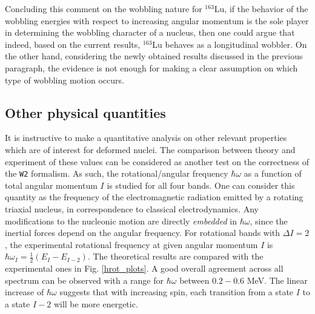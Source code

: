 \documentclass[myclassdoc,debug]{rjparticle}
\begin{document}
Concluding this comment on the wobbling nature for $^{163}$Lu, if the behavior of the wobbling energies with respect to increasing angular momentum is the sole player in determining the wobbling character of a nucleus, then one could argue that indeed, based on the current results, $^{163}$Lu behaves as a longitudinal wobbler. On the other hand, considering the newly obtained results discussed in the previous paragraph, the evidence is not enough for making a clear assumption on which type of wobbling motion occurs.

\subsection{Other physical quantities}\label{subsection:routhians}

It is instructive to make a quantitative analysis on other relevant properties which are of interest for deformed nuclei. The comparison between theory and experiment of these values can be considered as another test on the correctness of the \texttt{W2} formalism. As such, the rotational/angular frequency $\hbar\omega$ as a function of total angular momentum $I$ is studied for all four bands. One can consider this quantity as the frequency of the electromagnetic radiation emitted by a rotating triaxial nucleus, in correspondence to classical electrodynamics. Any modifications to the nucleonic motion are directly \emph{embedded} in $\hbar\omega$, since the inertial forces depend on the angular frequency. For rotational bands with $\Delta I=2$, the experimental rotational frequency at given angular momentum $I$ is $\hbar\omega_I=\frac{1}{2}\left(E_I-E_{I-2}\right)$. The theoretical results are compared with the experimental ones in Fig. \ref{hrot_plots}. A good overall agreement across all spectrum can be observed with a range for $\hbar\omega$ between $0.2-0.6$ MeV. The linear increase of $\hbar\omega$ suggests that with increasing spin, each transition from a state $I$ to a state $I-2$ will be more energetic.
\end{document}
